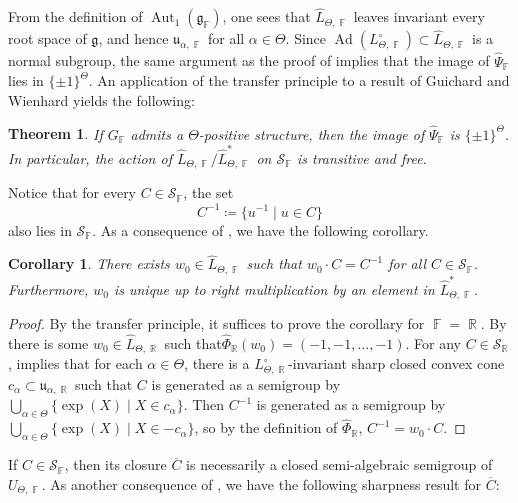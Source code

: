 \documentclass{amsart}
\theoremstyle{plain}
\newtheorem{theorem}[proposition]{Theorem}
\newtheorem{corollary}[proposition]{Corollary}
\theoremstyle{definition}
\DeclareMathOperator{\Aut}{Aut}
\DeclareMathOperator{\Ad}{Ad}
\DeclareMathOperator{\Fb}{{\mathbb{F}}}
\DeclareMathOperator{\Rb}{{\mathbb{R}}}
\newcommand{\1}{\mathbf{1}}
\begin{document}
From the definition of $\Aut_1(\mathfrak g_{\Fb})$, one sees that $\hat L_{\Theta,\Fb}$ leaves invariant every root space of $\mathfrak g$, and hence $\mathfrak u_{\alpha,\Fb}$ for all $\alpha\in\Theta$. Since $\Ad(L_{\Theta,\Fb}^\circ)\subset \hat L_{\Theta,\Fb}$ is a normal subgroup, the same argument as the proof of  implies that the image of $\hat\Psi_{\Fb}$ lies in $\{\pm1\}^{\Theta}$. An application of the transfer principle to a result of Guichard and Wienhard \cite[Proposition 5.2]{guichard2025generalizing} yields the following:

\begin{theorem}
\label{thm:ActionLThetaOnSemigroups}
 If $G_{\Fb}$ admits a $\Theta$-positive structure, then the image of $\hat\Psi_{\Fb}$ is $\{\pm1\}^\Theta$. In particular, the action of $\hat{L}_{\Theta,\Fb}/\hat{L}_{\Theta,\Fb}^*$ on $\mathcal S_{\Fb}$ is transitive and free.
\end{theorem}

Notice that for every $C\in\mathcal S_{\Fb}$, the set
\[C^{-1}\coloneqq\{u^{-1}\mid u\in C\}\]
also lies in $\mathcal{S}_{\Fb}$. As a consequence of , we have the following corollary.

\begin{corollary}
There exists $w_0\in \hat L_{\Theta,\Fb}$ such that 
$w_0\cdot C=C^{-1}$ for all $C\in\mathcal S_{\Fb}$. Furthermore, $w_0$ is unique up to right multiplication by an element in $\hat{L}_{\Theta,\Fb}^*$.
\end{corollary}

\begin{proof}
By the transfer principle, it suffices to prove the corollary for $\Fb=\Rb$. By  there is some $w_0\in \hat L_{\Theta,\Rb}$ such that\break $\hat\Phi_{\Rb}(w_0)=(-1,-1,\dots,-1)$. For any $C\in\mathcal S_{\Rb}$,  implies that for each $\alpha\in\Theta$, there is a $L_{\Theta,\Rb}^\circ$-invariant sharp closed convex cone $c_\alpha\subset\mathfrak u_{\alpha,\Rb}$ such that $C$ is generated as a semigroup by $\bigcup_{\alpha\in\Theta}\{\exp(X) \mid X\in c_\alpha\}$. Then $C^{-1}$ is generated as a semigroup by $\bigcup_{\alpha\in\Theta}\{\exp(X) \mid X\in -c_\alpha\}$, so by the definition of $\hat\Phi_{\Rb}$, $C^{-1}=w_0\cdot C$.
\end{proof}


If $C\in\mathcal S_{\Fb}$, then its closure $\overline{C}$ is necessarily a closed semi-algebraic semigroup of $U_{\Theta,\Fb}$. As another consequence of , we have the following sharpness result for $\overline{C}$:
\end{document}
